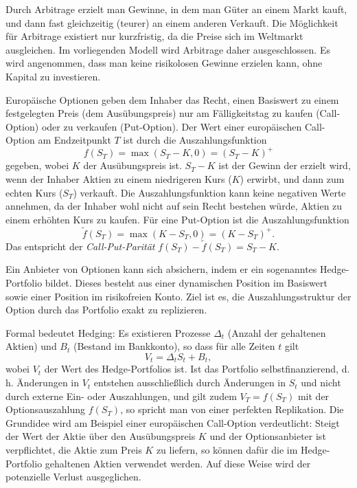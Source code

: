 \begin{defi}
Durch Arbitrage erzielt man Gewinne, in dem man Güter an einem Markt kauft, und dann fast gleichzeitig (teurer) an einem anderen Verkauft.
Die Möglichkeit für Arbitrage existiert nur kurzfristig, da die Preise sich im Weltmarkt ausgleichen. Im vorliegenden Modell wird Arbitrage daher ausgeschlossen.  
Es wird angenommen, dass man keine risikolosen Gewinne erzielen kann, ohne Kapital zu investieren.
\end{defi}

\begin{defi}
    Europäische Optionen geben dem Inhaber das Recht, 
    einen Basiswert zu einem festgelegten Preis (dem Ausübungspreis) nur am 
    Fälligkeitstag zu kaufen (Call-Option) oder zu verkaufen (Put-Option).
    Der Wert einer europäischen Call-Option am Endzeitpunkt $T$ ist durch die Auszahlungsfunktion
    $$f(S_T) = \max(S_T - K, 0) = (S_T - K)^+$$
    gegeben, wobei $K$ der Ausübungspreis ist. $S_T - K$ ist der Gewinn der erzielt wird, wenn der Inhaber
    Aktien zu einem niedrigeren Kurs ($K$) erwirbt, und dann zum echten Kurs ($S_T$) verkauft.
    Die Auszahlungsfunktion kann keine negativen Werte annehmen, da der Inhaber wohl nicht auf sein Recht bestehen würde, 
    Aktien zu einem erhöhten Kurs zu kaufen. Für eine Put-Option ist die Auszahlungsfunktion
    $$\tilde f(S_T) = \max(K - S_T, 0) = (K - S_T)^+.$$
Das entspricht der \textit{Call-Put-Parität}
    $f(S_T) - \tilde f(S_T) = S_T - K$.
\end{defi}

\begin{defi}[Hedging]
Ein Anbieter von Optionen kann sich absichern, indem er ein sogenanntes 
Hedge-Portfolio bildet. Dieses besteht aus einer dynamischen Position 
im Basiswert sowie einer Position im risikofreien Konto. Ziel ist es, die 
Auszahlungsstruktur der Option durch das Portfolio exakt zu replizieren.  

Formal bedeutet Hedging: Es existieren Prozesse $\Delta_t$ (Anzahl der 
gehaltenen Aktien) und $B_t$ (Bestand im Bankkonto), so dass für alle Zeiten $t$ gilt
\[
V_t = \Delta_t S_t + B_t,
\]
wobei $V_t$ der Wert des Hedge-Portfolios ist. Ist das Portfolio 
selbstfinanzierend, d. h. Änderungen in $V_t$ entstehen ausschließlich 
durch Änderungen in $S_t$ und nicht durch externe Ein- oder Auszahlungen, 
und gilt zudem $V_T = f(S_T)$ mit der Optionsauszahlung $f(S_T)$, 
so spricht man von einer perfekten Replikation. Die Grundidee wird am Beispiel einer europäischen Call-Option verdeutlicht: Steigt der Wert der Aktie über den Ausübungspreis $K$ und der Optionsanbieter ist verpflichtet, die Aktie zum Preis $K$ zu liefern, so können dafür die im Hedge-Portfolio gehaltenen Aktien verwendet werden. Auf diese Weise wird der potenzielle Verlust ausgeglichen.
\end{defi}


